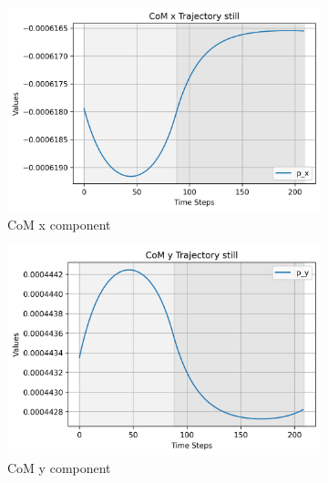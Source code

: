 \documentclass[main.tex]{subfiles}
\begin{document}
\begin{figure}[H]
    \centering
    \begin{subfigure}[b]{0.32\textwidth}
        \centering
        \includegraphics[width=\textwidth]{figures/CoM x Trajectory still.png}
        \caption{CoM x component}
        \label{fig:sub1}
    \end{subfigure}
    \hfill
    \begin{subfigure}[b]{0.32\textwidth}
        \centering
        \includegraphics[width=\textwidth]{figures/CoM y Trajectory still.png}
        \caption{CoM y component}
        \label{fig:sub2}
    \end{subfigure}
    \hfill
    \begin{subfigure}[b]{0.32\textwidth}
        \centering

\end{subfigure}
\end{figure}
\end{document}
